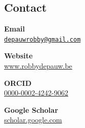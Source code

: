 \documentclass[
  letterpaper,
  DIV=11,
  numbers=noendperiod]{scrartcl}
\begin{document}
\subsection{Contact}\label{contact}

\textbf{Email}\\
\href{mailto:depauwrobby@gmail.com}{\nolinkurl{depauwrobby@gmail.com}}

\textbf{Website}\\
\href{https://www.robbydepauw.be/}{www.robbydepauw.be}

\textbf{ORCID}\\
\href{https://orcid.org/0000-0002-4242-9062}{0000-0002-4242-9062}

\textbf{Google Scholar}\\
\href{https://scholar.google.com/citations?user=ZDPPxVkAAAAJ&hl=nl}{scholar.google.com}
\end{document}
